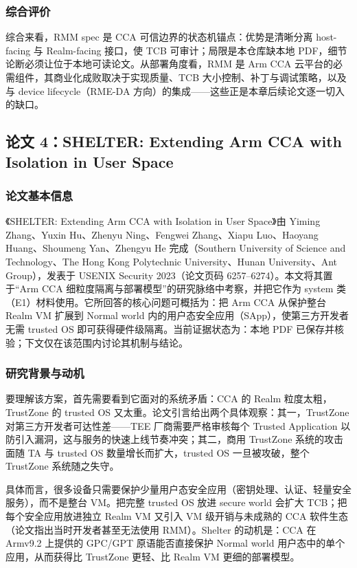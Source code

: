 \documentclass[11pt]{ctexart}
\begin{document}
\subsubsection{综合评价}
综合来看，RMM spec 是 CCA 可信边界的状态机锚点：优势是清晰分离 host-facing 与 Realm-facing 接口，使 TCB 可审计；局限是本仓库缺本地 PDF，细节论断必须让位于本地可读论文。从部署角度看，RMM 是 Arm CCA 云平台的必需组件，其商业化成败取决于实现质量、TCB 大小控制、补丁与调试策略，以及与 device lifecycle（RME-DA 方向）的集成——这些正是本章后续论文逐一切入的缺口。\par

\subsection{论文 4：SHELTER: Extending Arm CCA with Isolation in User Space}
\subsubsection{论文基本信息}
《SHELTER: Extending Arm CCA with Isolation in User Space》由 Yiming Zhang、Yuxin Hu、Zhenyu Ning、Fengwei Zhang、Xiapu Luo、Haoyang Huang、Shoumeng Yan、Zhengyu He 完成（Southern University of Science and Technology、The Hong Kong Polytechnic University、Hunan University、Ant Group），发表于 USENIX Security 2023（论文页码 6257--6274）。本文将其置于“Arm CCA 细粒度隔离与部署模型”的研究脉络中考察，并把它作为 system 类（E1）材料使用。它所回答的核心问题可概括为：把 Arm CCA 从保护整台 Realm VM 扩展到 Normal world 内的用户态安全应用（SApp），使第三方开发者无需 trusted OS 即可获得硬件级隔离。当前证据状态为：本地 PDF 已保存并核验；下文仅在该范围内讨论其机制与结论。\cite{zhang2023shelter}\par
\subsubsection{研究背景与动机}
要理解该方案，首先需要看到它面对的系统矛盾：CCA 的 Realm 粒度太粗，TrustZone 的 trusted OS 又太重。论文引言给出两个具体观察：其一，TrustZone 对第三方开发者可达性差——TEE 厂商需要严格审核每个 Trusted Application 以防引入漏洞，这与服务的快速上线节奏冲突；其二，商用 TrustZone 系统的攻击面随 TA 与 trusted OS 数量增长而扩大，trusted OS 一旦被攻破，整个 TrustZone 系统随之失守。\par
具体而言，很多设备只需要保护少量用户态安全应用（密钥处理、认证、轻量安全服务），而不是整台 VM。把完整 trusted OS 放进 secure world 会扩大 TCB；把每个安全应用放进独立 Realm VM 又引入 VM 级开销与未成熟的 CCA 软件生态（论文指出当时开发者甚至无法使用 RMM）。Shelter 的动机是：CCA 在 Armv9.2 上提供的 GPC/GPT 原语能否直接保护 Normal world 用户态中的单个应用，从而获得比 TrustZone 更轻、比 Realm VM 更细的部署模型。\par
\end{document}
